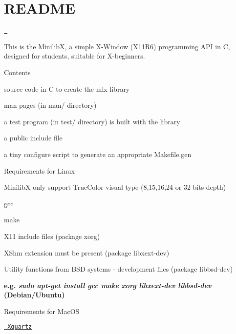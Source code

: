 \chapter{README}
\hypertarget{md_lib_2minilibx-linux_2README}{}\label{md_lib_2minilibx-linux_2README}
\href{https://github.com/42Paris/minilibx-linux/actions/workflows/ci.yml}{\texttt{ }}

This is the MinilibX, a simple X-\/\+Window (X11\+R6) programming API in C, designed for students, suitable for X-\/beginners.

Contents


\begin{DoxyItemize}
\item source code in C to create the mlx library
\item man pages (in man/ directory)
\item a test program (in test/ directory) is built with the library
\item a public include file 
\item a tiny configure script to generate an appropriate Makefile.\+gen
\end{DoxyItemize}

Requirements for Linux


\begin{DoxyItemize}
\item MinilibX only support True\+Color visual type (8,15,16,24 or 32 bits depth)
\item gcc
\item make
\item X11 include files (package xorg)
\item XShm extension must be present (package libxext-\/dev)
\item Utility functions from BSD systems -\/ development files (package libbsd-\/dev)
\item {\bfseries{e.\+g. {\itshape sudo apt-\/get install gcc make xorg libxext-\/dev libbsd-\/dev} (Debian/\+Ubuntu)}}
\end{DoxyItemize}

Requirements for Mac\+OS
\begin{DoxyItemize}
\item \href{https://www.xquartz.org/}{\texttt{ Xquartz}}
\end{DoxyItemize}


\begin{DoxyCode}{0}

\end{DoxyCode}


